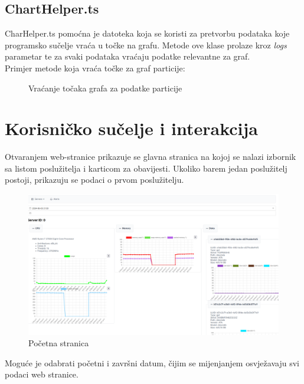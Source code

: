 \documentclass[zavrsnirad]{fer}
\begin{document}
\section{ChartHelper.ts}
CharHelper.ts pomoćna je datoteka koja se koristi za pretvorbu podataka koje programsko sučelje vraća u točke na grafu. Metode ove klase prolaze kroz \textit{logs} parametar te za svaki podataka vraćaju podatke relevantne za graf.
\\Primjer metode koja vraća točke za graf particije:
\begin{figure}[htb]
	\centering
	
	\caption{Vraćanje točaka grafa za podatke particije}
\end{figure}
\FloatBarrier

\chapter{Korisničko sučelje i interakcija}
Otvaranjem web-stranice prikazuje se glavna stranica na kojoj se nalazi izbornik sa listom poslužitelja i karticom za obavijesti. Ukoliko barem jedan poslužitelj postoji, prikazuju se podaci o prvom poslužitelju.
\begin{figure}[htb]
	\centering
	\includegraphics[width=1\linewidth]{images/web_1.png} 
	\caption{Početna stranica}
\end{figure}
\FloatBarrier
Moguće je odabrati početni i završni datum, čijim se mijenjanjem osvježavaju svi podaci web stranice.
\end{document}
